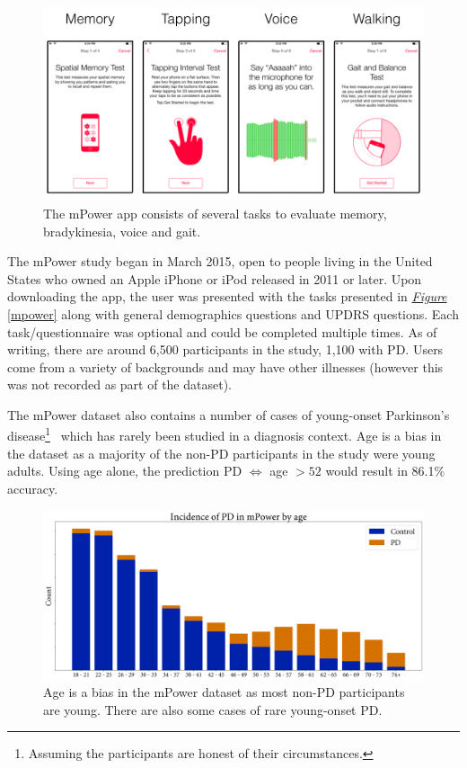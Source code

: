 \documentclass[12pt, twoside]{book}
\begin{document}
\begin{figure}[h]
\label{mpowerapp}
\centering\includegraphics[width=1\linewidth]{mpower.png}
\caption{The mPower app consists of several tasks to evaluate memory, bradykinesia, voice and gait. }
\end{figure}

The mPower study began in March 2015, open to people living in the United States who owned an Apple iPhone or iPod released in 2011 or later. Upon downloading the app, the user was presented with the tasks presented in \textit{\hyperref[mpower]{Figure}} \ref{mpower} along with general demographics questions and UPDRS questions. Each task/questionnaire was optional and could be completed multiple times. As of writing, there are around 6,500 participants in the study, 1,100 with PD. Users come from a variety of backgrounds and may have other illnesses (however this was not recorded as part of the dataset).

The mPower dataset also contains a number of cases of young-onset Parkinson's disease\footnote{Assuming the participants are honest of their circumstances.}~\cite{youngpd1, youngpd2} which has rarely been studied in a diagnosis context. Age is a bias in the dataset as a majority of the non-PD participants in the study were young adults. Using age alone, the prediction PD $\Leftrightarrow$ age $> 52$ would result in 86.1\% accuracy.

\addtocounter{footnote}{-1}
\begin{figure}[h]
\label{mpowerage}
\centering\includegraphics[width=1\linewidth]{mpowerage.png}
\caption{Age is a bias in the mPower dataset as most non-PD participants are young. There are also some cases of rare young-onset PD\protect\footnotemark.}
\end{figure}
\end{document}
